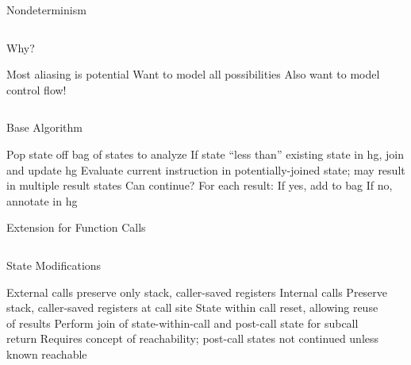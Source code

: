 \begin{frame}{Nondeterminism}
  \begin{columns}
    \begin{block}{Why?}
      \begin{outline}
        \1 Most aliasing is \alert{potential}
        \1 Want to model all possibilities
        \1 Also want to model control flow!
      \end{outline}
    \end{block}

    \begin{example}[Nondeterminism]
    \end{example}
  \end{columns}
\end{frame}

\begin{frame}{Base Algorithm}
  \begin{outline}[enumerate]
    \1 Pop state off \gls{bag} of states to analyze
    \1 If state \alert{``less than''} existing state in \gls{hg}, join and update \gls{hg}
    \1 Evaluate current instruction in potentially-joined state; may result in multiple result states
    \1 Can continue? For each result:
      \2 If yes, add to bag
      \2 If no, annotate in \gls{hg}
  \end{outline}
\end{frame}

\begin{frame}{Extension for Function Calls}
  \begin{columns}
    \begin{block}{State Modifications}
      \begin{outline}
        \1 External calls preserve only stack, \alert{caller-saved} registers
        \1 Internal calls
          \2 Preserve stack, \alert{caller-saved} registers at call site
          \2 State within call reset, allowing reuse of results
          \2 Perform join of state-within-call and post-call state for subcall return
        \1 Requires concept of \alert{reachability}; post-call states not continued unless known reachable
      \end{outline}
    \end{block}

    \begin{example}
    \end{example}
  \end{columns}
\end{frame}

